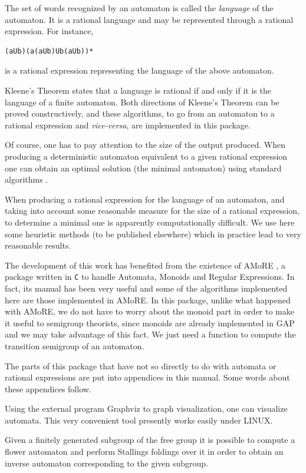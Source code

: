 \documentclass[a4paper,11pt]{report}
\begin{document}
{ The set of words recognized by an automaton is called the \emph{language} of the automaton. It is a rational language and may be represented through a
rational expression. For instance, 
\begin{Verbatim}[commandchars=!@|,fontsize=\small,frame=single,label=Example]
  (aUb)(a(aUb)Ub(aUb))*
\end{Verbatim}
 is a rational expression representing the language of the above automaton. 

 Kleene's Theorem states that a language is rational if and only if it is the
language of a finite automaton. Both directions of Kleene's Theorem can be
proved constructively, and these algorithms, to go from an automaton to a
rational expression and \emph{vice-versa}, are implemented in this package. 

 Of course, one has to pay attention to the size of the output produced. When
producing a deterministic automaton equivalent to a given rational expression
one can obtain an optimal solution (the minimal automaton) using standard
algorithms \cite{AHU:74}. 

 When producing a rational expression for the language of an automaton, and
taking into account some reasonable measure for the size of a rational
expression, to determine a minimal one is apparently computationally
difficult. We use here some heuristic methods (to be published elsewhere)
which in practice lead to very reasonable results. 

 The development of this work has benefited from the existence of AMoRE \cite{AMORE:95}, a package written in \texttt{C} to handle Automata, Monoids and Regular Expressions. In fact, its manual has
been very useful and some of the algorithms implemented here are those
implemented in AMoRE. In this package, unlike what happened with AMoRE, we do
not have to worry about the monoid part in order to make it useful to
semigroup theorists, since monoids are already implemented in \textsf{GAP} and we may take advantage of this fact. We just need a function to compute the
transition semigroup of an automaton. 

 

 The parts of this package that have not so directly to do with automata or
rational expressions are put into appendices in this manual. Some words about
these appendices follow. 

 Using the external program Graphviz \cite{KoutsofiosNorth:2002} to graph visualization, one can visualize automata. This very convenient tool
presently works easily under LINUX. 

 Given a finitely generated subgroup of the free group it is possible to
compute a flower automaton and perform Stallings foldings over it in order to
obtain an inverse automaton corresponding to the given subgroup. 

 }
\end{document}
